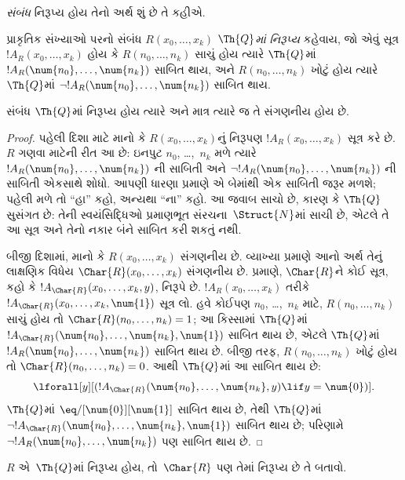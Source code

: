 \documentclass[../../../include/open-logic-section]{subfiles}
\begin{document}


\emph{સંબંધ} નિરૂપ્ય હોય તેનો
અર્થ શું છે તે કહીએ.

\begin{defn}
પ્રાકૃતિક સંખ્યાઓ પરનો સંબંધ
$R(x_0,\dots,x_k)$ {\em
$\Th{Q}$માં નિરૂપ્ય} કહેવાય,
જો એવું સૂત્ર $!A_R(x_0,\dots,x_k)$
હોય કે $R(n_0,\dots,n_k)$
સાચું હોય ત્યારે
$\Th{Q}$માં
$!A_R(\num{n_0},\dots,\num{n_k})$
સાબિત થાય, અને
$R(n_0,\dots,n_k)$ ખોટું હોય
ત્યારે $\Th{Q}$માં
$\lnot !A_R(\num{n_0},
\dots, \num{n_k})$ સાબિત થાય.
\end{defn}

\begin{thm}
સંબંધ $\Th{Q}$માં નિરૂપ્ય
હોય ત્યારે અને માત્ર ત્યારે જ
તે સંગણનીય હોય છે.
\end{thm}

\begin{proof}
પહેલી દિશા માટે માનો કે
$R(x_0,\dots,x_k)$નું નિરૂપણ
$!A_R(x_0,\dots,x_k)$ સૂત્ર
કરે છે. $R$ ગણવા માટેની
રીત આ છે: ઇનપુટ
$n_0$, \dots,~$n_k$ મળે ત્યારે
$!A_R(\num{n_0}, \dots, \num{n_k})$
ની સાબિતી અને
$\lnot !A_R(\num{n_0}, \dots, \num{n_k})$
ની સાબિતી એકસાથે શોધો.
આપણી ધારણા પ્રમાણે એ બેમાંથી
એક સાબિતી જરૂર મળશે; પહેલી
મળે તો ``હા'' કહો, અન્યથા
``ના'' કહો.
આ જવાબ સાચો છે, કારણ કે $\Th{Q}$ સુસંગત છે:
તેની સ્વયંસિદ્ધિઓ પ્રમાણભૂત સંરચના~$\Struct{N}$માં સાચી છે,
એટલે તે આ સૂત્ર અને તેનો નકાર બંને સાબિત કરી શકતું નથી.

બીજી દિશામાં, માનો કે
$R(x_0, \dots, x_k)$ સંગણનીય
છે. વ્યાખ્યા પ્રમાણે આનો અર્થ
તેનું લાક્ષણિક વિધેય
$\Char{R}(x_0, \dots, x_k)$
સંગણનીય છે. 
પ્રમાણે, $\Char{R}$ને કોઈ
સૂત્ર, કહો કે
$!A_{\Char{R}}(x_0, \dots, x_k,
y)$, નિરૂપે છે.
$!A_R(x_0, \dots, x_k)$ તરીકે
$!A_{\Char{R}}(x_0,
\dots, x_k, \num{1})$ સૂત્ર
લો. હવે કોઈપણ $n_0$,
\dots,~$n_k$ માટે,
$R(n_0, \dots, n_k)$ સાચું
હોય તો $\Char{R}(n_0, \dots,
n_k) = 1$; આ કિસ્સામાં
$\Th{Q}$માં
$!A_{\Char{R}}(\num{n_0}, \dots, \num{n_k},
\num{1})$ સાબિત થાય છે,
એટલે $\Th{Q}$માં
$!A_R(\num{n_0}, \dots,
\num{n_k})$ સાબિત થાય છે.
બીજી તરફ, $R(n_0, \dots,
n_k)$ ખોટું હોય તો
$\Char{R}(n_0, \dots, n_k) = 0$.
આથી $\Th{Q}$માં આ સાબિત થાય છે:
\[
\lforall[y][(!A_{\Char{R}}(\num{n_0}, \dots, \num{n_k}, y) \lif y =
  \num{0})].
\]
$\Th{Q}$માં
$\eq/[\num{0}][\num{1}]$
સાબિત થાય છે, તેથી
$\Th{Q}$માં
$\lnot !A_{\Char{R}}(\num{n_0}, \dots, \num{n_k}, \num{1})$
સાબિત થાય છે; પરિણામે
$\lnot !A_R(\num{n_0}, \dots, \num{n_k})$
પણ સાબિત થાય છે.
\end{proof}

\begin{prob}
$R$ એ~$\Th{Q}$માં નિરૂપ્ય
હોય, તો~$\Char{R}$ પણ તેમાં
નિરૂપ્ય છે તે બતાવો.
\end{prob}
\end{document}
